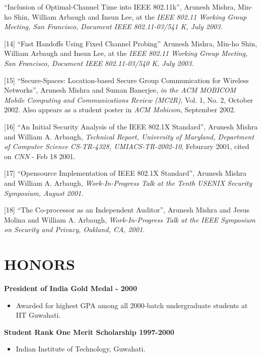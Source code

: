 \begin{resume}
[13] ``Inclusion of Optimal-Channel Time into IEEE 802.11k'', Arunesh Mishra,  Min-ho Shin, William Arbaugh and Insun Lee,
at the {\em IEEE 802.11 Working Group Meeting, San Francisco, Document IEEE 802.11-03/541 K, July 2003}.

[14] ``Fast Handoffs Using Fixed Channel Probing'' Arunesh Mishra, Min-ho Shin, William Arbaugh and Insun Lee, at the 
{\em IEEE 802.11 Working Group Meeting, San Francisco, Document IEEE 802.11-03/540 K, July 2003}.

[15] ``Secure-Spaces: Location-based Secure Group Communication for Wireless Networks'', Arunesh Mishra and 
Suman Banerjee, {\em in the ACM MOBICOM Mobile Computing and Communications Review (MC2R)}, Vol. 1, No. 2, October 2002.
Also appears as a student poster in {\em ACM Mobicom}, September 2002.


[16] ``An Initial Security Analysis of the IEEE 802.1X Standard'', Arunesh Mishra and William A. Arbaugh,
{\em Technical Report, University of Maryland, Department of Computer Science CS-TR-4328, 
UMIACS-TR-2002-10}, Feburary 2001, cited on {\em CNN} - Feb 18 2001.


[17] ``Opensource Implementation of IEEE 802.1X Standard'', Arunesh Mishra and William A. Arbaugh,
{\em Work-In-Progress Talk at the Tenth USENIX Security Symposium, August 2001}.


[18] ``The Co-processor as an Independent Auditor'', Arunesh Mishra and Jesus Molina and William A. Arbaugh,
{\em Work-In-Progress Talk at the IEEE Symposium on Security and Privacy, Oakland, CA, 2001}.



\section{HONORS}
\vspace{0.1in}

{\bf President of India Gold Medal - 2000}
    \begin{itemize}
         \item[] Awarded for highest GPA among all 2000-batch undergraduate students at IIT Guwahati.
    \end{itemize}


{\bf Student Rank One Merit Scholarship 1997-2000}
    \begin{itemize}
         \item[] Indian Institute of Technology, Guwahati.
    \end{itemize}


\end{resume}
